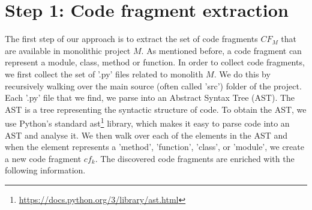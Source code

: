 \section{Step 1: Code fragment extraction}\label{s:step1_cf_extraction}
The first step of our approach is to extract the set of code fragments $CF_M$ that are available in monolithic project $M$. As mentioned before, a code fragment can represent a module, class, method or function. 
In order to collect code fragments, we first collect the set of '.py' files related to monolith $M$. We do this by recursively walking over the main source (often called 'src') folder of the project. Each '.py' file that we find, we parse into an Abstract Syntax Tree (AST). The AST is a tree representing the syntactic structure of code. To obtain the AST, we use Python's standard ast\footnote{\href{https://docs.python.org/3/library/ast.html}{https://docs.python.org/3/library/ast.html}} library, which makes it easy to parse code into an AST and analyse it.
We then walk over each of the elements in the AST and when the element represents a 'method', 'function', 'class', or 'module', we create a new code fragment $cf_k$. The discovered code fragments are enriched with the following information.

